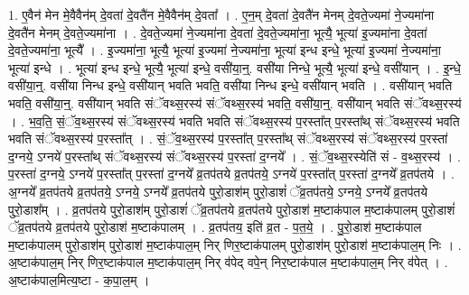 \documentclass[17pt]{extarticle}
\begin{document}
1. ए॒वैन॑ मेन मे॒वैवैन॑म् दे॒वता॑ दे॒वतै॑न मे॒वैवैन॑म् दे॒वता᳚ । . ए॒न॒म् दे॒वता॑ दे॒वतै॑न मेनम् दे॒वते॒ज्यमा॑ ने॒ज्यमा॑ना दे॒वतै॑न मेनम् दे॒वते॒ज्यमा॑ना । . दे॒वते॒ज्यमा॑ ने॒ज्यमा॑ना दे॒वता॑ दे॒वते॒ज्यमा॑ना॒ भूत्यै॒ भूत्या॑ इ॒ज्यमा॑ना दे॒वता॑ दे॒वते॒ज्यमा॑ना॒ भूत्यै᳚ । . इ॒ज्यमा॑ना॒ भूत्यै॒ भूत्या॑ इ॒ज्यमा॑ ने॒ज्यमा॑ना॒ भूत्या॑ इन्ध इन्धे॒ भूत्या॑ इ॒ज्यमा॑ ने॒ज्यमा॑ना॒ भूत्या॑ इन्धे । . भूत्या॑ इन्ध इन्धे॒ भूत्यै॒ भूत्या॑ इन्धे॒ वसी॑या॒न्॒. वसी॑या निन्धे॒ भूत्यै॒ भूत्या॑ इन्धे॒ वसी॑यान् । . इ॒न्धे॒ वसी॑या॒न्॒. वसी॑या निन्ध इन्धे॒ वसी॑यान् भवति भवति॒ वसी॑या निन्ध इन्धे॒ वसी॑यान् भवति । . वसी॑यान् भवति भवति॒ वसी॑या॒न्॒. वसी॑यान् भवति संॅवथ्स॒रस्य॑ संॅवथ्स॒रस्य॑ भवति॒ वसी॑या॒न्॒. वसी॑यान् भवति संॅवथ्स॒रस्य॑ । . भ॒व॒ति॒ सं॒ॅव॒थ्स॒रस्य॑ संॅवथ्स॒रस्य॑ भवति भवति संॅवथ्स॒रस्य॑ प॒रस्ता᳚त् प॒रस्ता᳚थ् संॅवथ्स॒रस्य॑ भवति भवति संॅवथ्स॒रस्य॑ प॒रस्ता᳚त् । . सं॒ॅव॒थ्स॒रस्य॑ प॒रस्ता᳚त् प॒रस्ता᳚थ् संॅवथ्स॒रस्य॑ संॅवथ्स॒रस्य॑ प॒रस्ता॑ द॒ग्नये॒ ऽग्नये॑ प॒रस्ता᳚थ् संॅवथ्स॒रस्य॑ संॅवथ्स॒रस्य॑ प॒रस्ता॑ द॒ग्नये᳚ । . सं॒ॅव॒थ्स॒रस्येति॑ सं - व॒थ्स॒रस्य॑ । . प॒रस्ता॑ द॒ग्नये॒ ऽग्नये॑ प॒रस्ता᳚त् प॒रस्ता॑ द॒ग्नये᳚ व्र॒तप॑तये व्र॒तप॑तये॒ ऽग्नये॑ प॒रस्ता᳚त् प॒रस्ता॑ द॒ग्नये᳚ व्र॒तप॑तये । . अ॒ग्नये᳚ व्र॒तप॑तये व्र॒तप॑तये॒ ऽग्नये॒ ऽग्नये᳚ व्र॒तप॑तये पुरो॒डाश॑म् पुरो॒डाशं॑ ॅव्र॒तप॑तये॒ ऽग्नये॒ ऽग्नये᳚ व्र॒तप॑तये पुरो॒डाश᳚म् । . व्र॒तप॑तये पुरो॒डाश॑म् पुरो॒डाशं॑ ॅव्र॒तप॑तये व्र॒तप॑तये पुरो॒डाश॑ म॒ष्टाक॑पाल म॒ष्टाक॑पालम् पुरो॒डाशं॑ ॅव्र॒तप॑तये व्र॒तप॑तये पुरो॒डाश॑ म॒ष्टाक॑पालम् । . व्र॒तप॑तय॒ इति॑ व्र॒त - प॒त॒ये॒ । . पु॒रो॒डाश॑ म॒ष्टाक॑पाल म॒ष्टाक॑पालम् पुरो॒डाश॑म् पुरो॒डाश॑ म॒ष्टाक॑पाल॒म् निर् णिर॒ष्टाक॑पालम् पुरो॒डाश॑म् पुरो॒डाश॑ म॒ष्टाक॑पाल॒म् निः । . अ॒ष्टाक॑पाल॒म् निर् णिर॒ष्टाक॑पाल म॒ष्टाक॑पाल॒म् निर् व॑पेद् वपे॒न् निर॒ष्टाक॑पाल म॒ष्टाक॑पाल॒म् निर् व॑पेत् । . अ॒ष्टाक॑पाल॒मित्य॒ष्टा - क॒पा॒ल॒म् । \newline
\end{document}
